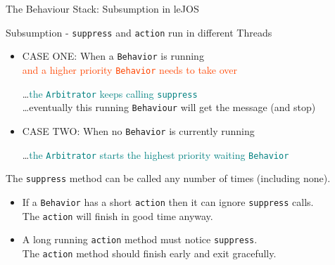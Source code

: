 \documentclass[color=pdftex,usenames,dvipsnames, aspectratio=169]{beamer}
\begin{document}
\begin{frame}{The Behaviour Stack: Subsumption in leJOS}
\begin{block}{Subsumption - \lstinline[identifierstyle=\bfseries\color{yellow}]!suppress! and \lstinline[identifierstyle=\bfseries\color{yellow}]!action! run in different Threads}
\begin{itemize}
\item CASE ONE: \textcolor{BrickRed}{When a \lstinline!Behavior! is running\\}
 \textcolor{OrangeRed}{and a higher priority \lstinline!Behavior! needs to take over}

\dots \textcolor{teal}{the \lstinline!Arbitrator! keeps calling \lstinline!suppress!\\}
\dots \textcolor{OliveGreen}{eventually this running \lstinline!Behaviour! will get the message (and stop)}
\item CASE TWO: \textcolor{BrickRed}{When no \lstinline!Behavior! is currently running}

\dots \textcolor{teal}{the \lstinline!Arbitrator! starts the highest priority waiting \lstinline!Behavior!}
\end{itemize}
\end{block}
\begin{block}{The \lstinline[identifierstyle=\bfseries\color{yellow}]!suppress! method can be called any number of times (including none).}
\begin{itemize}
\item If a \lstinline!Behavior! has a short \lstinline!action! then it can ignore \lstinline!suppress! calls.\\
\textcolor{OliveGreen}{The \lstinline!action! will finish in good time anyway.}
\item A long running \lstinline!action! method must notice \lstinline!suppress!.\\ 
\textcolor{OliveGreen}{The \lstinline!action! method should finish early and exit gracefully.}
\end{itemize}

\end{block}
\end{frame}
\end{document}
